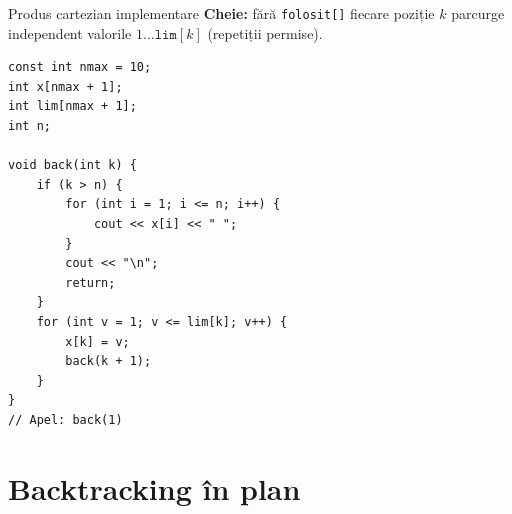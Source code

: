 ﻿\documentclass[10pt]{beamer}
\begin{document}
\begin{frame}[fragile]{Produs cartezian \textemdash{} implementare}
  \textbf{Cheie:} fără \texttt{folosit[]} \textemdash{} fiecare poziție $k$ parcurge
  independent valorile $1 \ldots \texttt{lim}[k]$ (repetiții permise).
  \begin{lstlisting}
const int nmax = 10;
int x[nmax + 1];
int lim[nmax + 1];
int n;

void back(int k) {
    if (k > n) {
        for (int i = 1; i <= n; i++) {
            cout << x[i] << " ";
        }
        cout << "\n";
        return;
    }
    for (int v = 1; v <= lim[k]; v++) {
        x[k] = v;
        back(k + 1);
    }
}
// Apel: back(1)
  \end{lstlisting}
\end{frame}

\section{Backtracking în plan}
\end{document}
